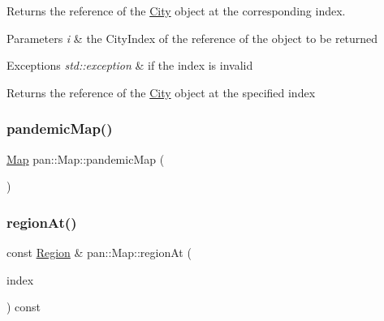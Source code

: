 Returns the reference of the \hyperlink{classpan_1_1_city}{City} object at the corresponding index. 
\begin{DoxyParams}{Parameters}
{\em i} & the City\+Index of the reference of the object to be returned \\
\hline
\end{DoxyParams}

\begin{DoxyExceptions}{Exceptions}
{\em std\+::exception} & if the index is invalid \\
\hline
\end{DoxyExceptions}
\begin{DoxyReturn}{Returns}
the reference of the \hyperlink{classpan_1_1_city}{City} object at the specified index 
\end{DoxyReturn}
\mbox{\label{classpan_1_1_map_afc16b42064eca43b341cd4a555bed092}} 
\subsubsection{\texorpdfstring{pandemic\+Map()}{pandemicMap()}}
{\footnotesize\ttfamily \hyperlink{classpan_1_1_map}{Map} pan\+::\+Map\+::pandemic\+Map (\begin{DoxyParamCaption}{ }\end{DoxyParamCaption})\hspace{0.3cm}{\ttfamily [static]}}

\mbox{\label{classpan_1_1_map_ac0597ceffd926725744a6518c7773421}} 
\subsubsection{\texorpdfstring{region\+At()}{regionAt()}}
{\footnotesize\ttfamily const \hyperlink{classpan_1_1_region}{Region} \& pan\+::\+Map\+::region\+At (\begin{DoxyParamCaption}\item[{\hyperlink{namespacepan_a648dcc32a76222a9e4cd4a3e80bda642}{Region\+Index}}]{index }\end{DoxyParamCaption}) const\hspace{0.3cm}{\ttfamily [inline]}}

